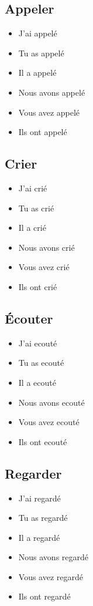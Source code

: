 \subsection{Appeler}

\begin{itemize}
    \item J'ai appelé 
    \item Tu as appelé 
    \item Il a appelé 
    \item Nous avons appelé 
    \item Vous avez appelé 
    \item Ils ont appelé
\end{itemize}

\subsection{Crier}

\begin{itemize}
    \item J'ai crié 
    \item Tu as crié 
    \item Il a crié 
    \item Nous avons crié 
    \item Vous avez crié 
    \item Ils ont crié
\end{itemize}

\subsection{Écouter}

\begin{itemize}
    \item J'ai ecouté
    \item Tu as ecouté 
    \item Il a ecouté 
    \item Nous avons ecouté
    \item Vous avez ecouté
    \item Ils ont ecouté
\end{itemize}

\subsection{Regarder}

\begin{itemize}
    \item J'ai regardé 
    \item Tu as regardé 
    \item Il a regardé 
    \item Nous avons regardé 
    \item Vous avez regardé 
    \item Ils ont regardé 
\end{itemize}

